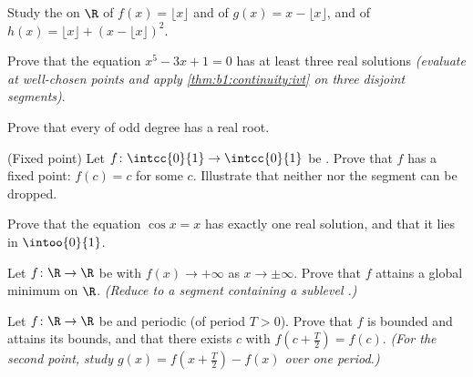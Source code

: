 \begin{exercise}[$\star$]\label{exo:b1:continuity:2}
Study the  on $\R$ of $f(x) = \lfloor x \rfloor$ and of
$g(x) = x - \lfloor x \rfloor$, and of $h(x) = \lfloor x \rfloor +
(x - \lfloor x\rfloor)^2$.
\end{exercise}

\begin{exercise}[$\star$]\label{exo:b1:continuity:3}
Prove that the equation $x^5 - 3x + 1 = 0$ has at least three real
solutions \emph{(evaluate at well-chosen points and apply
\cref{thm:b1:continuity:ivt} on three disjoint segments)}.
\end{exercise}

\begin{exercise}[$\star$]\label{exo:b1:continuity:4}
Prove that every  of odd degree has a real root.
\end{exercise}

\begin{exercise}[$\star\star$]\label{exo:b1:continuity:5}
(Fixed point) Let $f \colon \intcc{0}{1} \to \intcc{0}{1}$ be
. Prove that $f$ has a fixed point: $f(c) = c$ for some
$c$. Illustrate that neither  nor the segment can be
dropped.
\end{exercise}

\begin{exercise}[$\star\star$]\label{exo:b1:continuity:6}
Prove that the equation $\cos x = x$ has exactly one real solution,
and that it lies in $\intoo{0}{1}$.
\end{exercise}

\begin{exercise}[$\star\star$]\label{exo:b1:continuity:7}
Let $f \colon \R \to \R$ be  with $f(x) \to +\infty$ as $x
\to \pm\infty$. Prove that $f$ attains a global minimum on $\R$.
\emph{(Reduce to a segment containing a sublevel .)}
\end{exercise}

\begin{exercise}[$\star\star$]\label{exo:b1:continuity:8}
Let $f \colon \R \to \R$ be  and periodic (of period $T >
0$). Prove that $f$ is bounded and attains its bounds, and that there
exists $c$ with $f(c + \frac T2) = f(c)$. \emph{(For the second
point, study $g(x) = f(x + \frac T2) - f(x)$ over one period.)}
\end{exercise}

